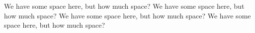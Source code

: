\documentclass[11pt]{article}
\begin{document}
\begin{multicols*}{2}
        We have some space here, but how much space? We have some space here, but how much space? We have some space here, but how much space? We have some space here, but how much space?

        
        
        
    
    \end{multicols*}
\end{document}
